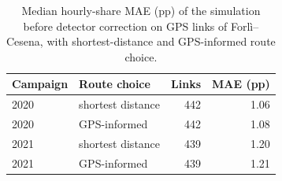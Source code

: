 \begin{table}[htbp]\centering
\caption{Median hourly-share MAE (pp) of the simulation before detector correction on GPS links of Forl\`i--Cesena, with shortest-distance and GPS-informed route choice.}
\label{tab:routing_shape}
\begin{tabular}{@{}llrr@{}}\toprule
Campaign & Route choice & Links & MAE (pp) \\\midrule
2020 & shortest distance & 442 & 1.06 \\
2020 & GPS-informed & 442 & 1.08 \\
2021 & shortest distance & 439 & 1.20 \\
2021 & GPS-informed & 439 & 1.21 \\
\bottomrule\end{tabular}\end{table}
